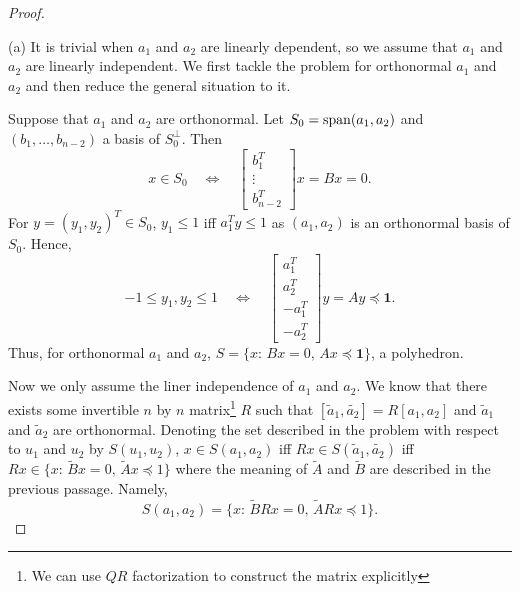 \begin{proof}
  $\,$\par
  (a) It is trivial when $a_1$ and $a_2$ are linearly dependent, so we assume 
  that $a_1$ and $a_2$ are linearly independent. We first tackle the problem for
  orthonormal $a_1$ and $a_2$ and then reduce the general situation to it.\par
  Suppose that $a_1$ and $a_2$ are orthonormal. Let $S_0=\operatorname{span}(a_1,a_2)$ and 
  $(b_1,\dots,b_{n-2})$ a basis of $S_0^\perp$. Then
  \[
    x\in S_0 \quad\Leftrightarrow\quad
    \begin{bmatrix}
      b_1^T \\ \vdots \\ b_{n-2}^T 
    \end{bmatrix}x = Bx = 0.
  \]
  For $y=(y_1,y_2)^T\in S_0$, $y_1\le 1$ iff $a_1^Ty \le 1$ as $(a_1,a_2)$ is an
  orthonormal basis of $S_0$. Hence, 
  \[
    -1\le y_1,y_2\le 1 \quad\Leftrightarrow\quad
    \begin{bmatrix}
      a_1^T \\ a_2^T \\ -a_1^T \\ -a_2^T
    \end{bmatrix}y = Ay \preceq \mathbf{1}.
  \]
  Thus, for orthonormal $a_1$ and $a_2$, $S=\{x:\, Bx=0,\, Ax\preceq\mathbf{1}\}
  $, a polyhedron.\par
  Now we only assume the liner independence of $a_1$ and $a_2$. We know that
  there exists some invertible $n$ by $n$ matrix\footnote{We can use $QR$ 
  factorization to construct the matrix explicitly} $R$ such that $[\tilde{a}_1,
  \tilde{a_2}]=R[a_1,a_2]$ and $\tilde{a}_1$ and $\tilde{a}_2$ are orthonormal. 
  Denoting the set described in the problem with respect to $u_1$ and $u_2$ by
  $S(u_1,u_2)$, $x\in S(a_1,a_2)$ iff $Rx\in S(\tilde{a}_1,\tilde{a_2})$ iff
  $Rx \in \{x:\,\tilde{B}x=0,\, \tilde{A}x\preceq 1\}$ where the meaning of 
  $\tilde{A}$ and $\tilde{B}$ are described in the previous passage. Namely, 
  \[
    S(a_1,a_2) = \{x:\, \tilde{B}Rx=0,\, \tilde{A}Rx\preceq 1\}.
  \]
  

\end{proof}
